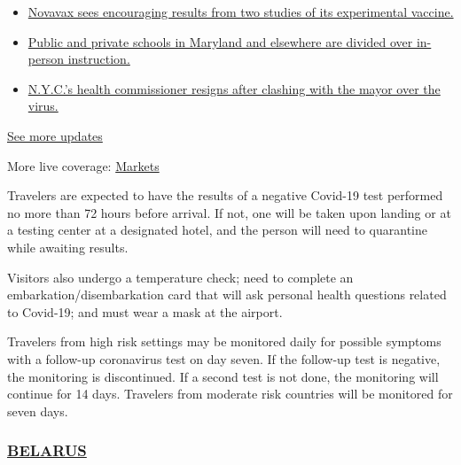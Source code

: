 \begin{itemize}
\tightlist
\item
  \href{https://www.nytimes.com/2020/08/04/world/coronavirus-cases.html?action=click\&pgtype=Article\&state=default\&region=MAIN_CONTENT_1\&context=storylines_live_updates\#link-1228a480}{Novavax
  sees encouraging results from two studies of its experimental
  vaccine.}
\item
  \href{https://www.nytimes.com/2020/08/04/world/coronavirus-cases.html?action=click\&pgtype=Article\&state=default\&region=MAIN_CONTENT_1\&context=storylines_live_updates\#link-4825b93}{Public
  and private schools in Maryland and elsewhere are divided over
  in-person instruction.}
\item
  \href{https://www.nytimes.com/2020/08/04/world/coronavirus-cases.html?action=click\&pgtype=Article\&state=default\&region=MAIN_CONTENT_1\&context=storylines_live_updates\#link-4d1eafa8}{N.Y.C.'s
  health commissioner resigns after clashing with the mayor over the
  virus.}
\end{itemize}

\href{https://www.nytimes.com/2020/08/04/world/coronavirus-cases.html?action=click\&pgtype=Article\&state=default\&region=MAIN_CONTENT_1\&context=storylines_live_updates}{See
more updates}

More live coverage:
\href{https://www.nytimes.com/live/2020/08/04/business/stock-market-today-coronavirus?action=click\&pgtype=Article\&state=default\&region=MAIN_CONTENT_1\&context=storylines_live_updates}{Markets}

Travelers are expected to have the results of a negative Covid-19 test
performed no more than 72 hours before arrival. If not, one will be
taken upon landing or at a testing center at a designated hotel, and the
person will need to quarantine while awaiting results.

Visitors also undergo a temperature check; need to complete an
embarkation/disembarkation card that will ask personal health questions
related to Covid-19; and must wear a mask at the airport.

Travelers from high risk settings may be monitored daily for possible
symptoms with a follow-up coronavirus test on day seven. If the
follow-up test is negative, the monitoring is discontinued. If a second
test is not done, the monitoring will continue for 14 days. Travelers
from moderate risk countries will be monitored for seven days.

\hypertarget{belarus}{%
\subsubsection{\texorpdfstring{\href{https://by.usembassy.gov/u-s-citizen-services/covid-19-information/}{BELARUS}}{BELARUS}}\label{belarus}}


